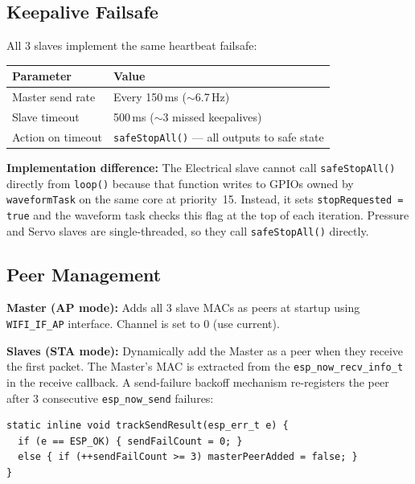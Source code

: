 \documentclass[11pt,a4paper]{article}
\begin{document}
\subsection{Keepalive Failsafe}

All 3 slaves implement the same heartbeat failsafe:

\begin{center}
\begin{tabular}{ll}
\toprule
\textbf{Parameter} & \textbf{Value} \\
\midrule
Master send rate & Every 150\,ms ($\sim$6.7\,Hz) \\
Slave timeout    & 500\,ms ($\sim$3 missed keepalives) \\
Action on timeout & \texttt{safeStopAll()} --- all outputs to safe state \\
\bottomrule
\end{tabular}
\end{center}

\textbf{Implementation difference:} The Electrical slave cannot call
\texttt{safeStopAll()} directly from \texttt{loop()} because that function
writes to GPIOs owned by \texttt{waveformTask} on the same core at
priority~15. Instead, it sets \texttt{stopRequested = true} and the waveform
task checks this flag at the top of each iteration. Pressure and Servo slaves
are single-threaded, so they call \texttt{safeStopAll()} directly.

\subsection{Peer Management}

\textbf{Master (AP mode):} Adds all 3 slave MACs as peers at startup using
\texttt{WIFI\_IF\_AP} interface. Channel is set to 0 (use current).

\textbf{Slaves (STA mode):} Dynamically add the Master as a peer when they
receive the first packet. The Master's MAC is extracted from the
\texttt{esp\_now\_recv\_info\_t} in the receive callback. A send-failure backoff
mechanism re-registers the peer after 3 consecutive \texttt{esp\_now\_send}
failures:

\begin{lstlisting}[style=cppstyle]
static inline void trackSendResult(esp_err_t e) {
  if (e == ESP_OK) { sendFailCount = 0; }
  else { if (++sendFailCount >= 3) masterPeerAdded = false; }
}
\end{lstlisting}

\end{document}
